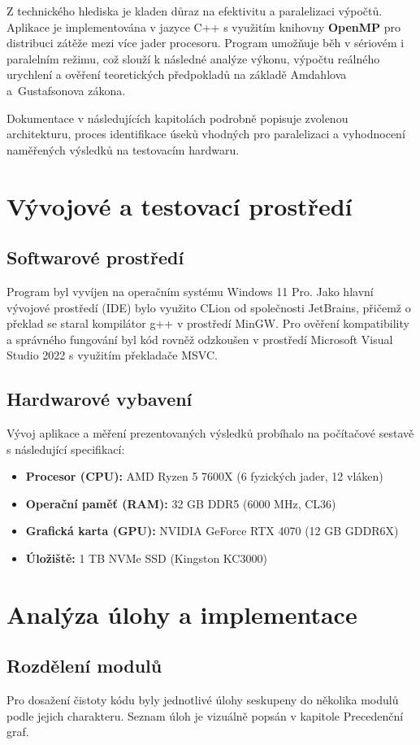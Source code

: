 \documentclass[10pt, a4paper]{report}
\begin{document}
	Z technického hlediska je kladen důraz na efektivitu a paralelizaci výpočtů. Aplikace je implementována v jazyce C++ s využitím knihovny \textbf{OpenMP} pro distribuci zátěže mezi více jader procesoru. Program umožňuje běh v sériovém i paralelním režimu, což slouží k následné analýze výkonu, výpočtu reálného urychlení a ověření teoretických předpokladů na základě Amdahlova a~Gustafsonova zákona.
	
	Dokumentace v následujících kapitolách podrobně popisuje zvolenou architekturu, proces identifikace úseků vhodných pro paralelizaci a vyhodnocení naměřených výsledků na testovacím hardwaru.
	
	\chapter{Vývojové a testovací prostředí}
	\section{Softwarové prostředí}
	Program byl vyvíjen na operačním systému Windows 11 Pro. Jako hlavní vývojové prostředí (IDE) bylo využito CLion od společnosti JetBrains, přičemž o překlad se staral kompilátor g++ v prostředí MinGW. Pro ověření kompatibility a správného fungování byl kód rovněž odzkoušen v prostředí Microsoft Visual Studio 2022 s využitím překladače MSVC.
	
	\section{Hardwarové vybavení}
	Vývoj aplikace a měření prezentovaných výsledků probíhalo na počítačové sestavě s následující specifikací:
	\begin{itemize}
		\item \textbf{Procesor (CPU):} AMD Ryzen 5 7600X (6 fyzických jader, 12 vláken)
		\item \textbf{Operační paměť (RAM):} 32 GB DDR5 (6000 MHz, CL36)
		\item \textbf{Grafická karta (GPU):} NVIDIA GeForce RTX 4070 (12 GB GDDR6X)
		\item \textbf{Úložiště:} 1 TB NVMe SSD (Kingston KC3000)
	\end{itemize}
	
	\chapter{Analýza úlohy a implementace}
	\section{Rozdělení modulů}
	Pro dosažení čistoty kódu byly jednotlivé úlohy seskupeny do několika modulů podle jejich charakteru. Seznam úloh je vizuálně popsán v kapitole Precedenční graf.
	
\end{document}
